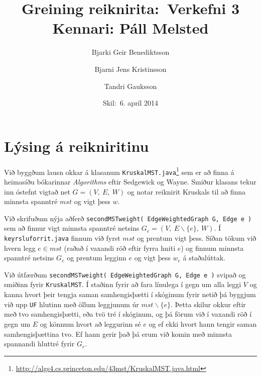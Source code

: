 \documentclass[a4paper,oneside]{article}
\title{
    Greining reiknirita:\ Verkefni 3
    \\\small{Kennari: Páll Melsted}
}
\author{Bjarki Geir Benediktsson \and  Bjarni Jens Kristinsson \and Tandri Gauksson}
\date{\small{Skil:\ 6. apríl 2014}}
\begin{document}
\maketitle

\section{Lýsing á reikniritinu}
Við byggðum lausn okkar á klasanum \texttt{KruskalMST.java}\footnote{\url{http://algs4.cs.princeton.edu/43mst/KruskalMST.java.html}} sem er að finna á heimasíðu bókarinnar \emph{Algorithms} eftir Sedgewick og Wayne. Smiður klasans tekur inn óstefnt vigtað net $G=(V, \ E, \ W)$ og notar reiknirit Kruskals til að finna minnsta spanntré $mst$ og vigt þess $w$.

Við skrifuðum nýja aðferð \texttt{secondMSTweight( EdgeWeightedGraph G, Edge e )} sem að finnur vigt minnsta spanntré netsins $G_e=(V, \ E \smallsetminus \{ e \}, \ W)$. Í \texttt{keyrsluforrit.java} finnum við fyrst $mst$ og prentum vigt þess. Síðan tökum við hvern legg $e \in mst$ (raðað í vaxandi röð eftir fyrra hniti $e$) og finnum minnsta spanntré netsins $G_e$ og prentum legginn $e$ og vigt þess $w_e$ á staðalúttak. 

Við útfærðum \texttt{secondMSTweight( EdgeWeightedGraph G, Edge e )} svipað og smiðinn fyrir \texttt{KruskalMST}. Í staðinn fyrir að fara línulega í gegn um alla leggi $V$ og kanna hvort þeir tengja saman samhengisþætti í skóginum fyrir netið þá byggjum við upp \texttt{UF} hlutinn með öllum leggjunum úr $mst \smallsetminus \{ e \}$. Þetta skilur okkur eftir með tvo samhengisþætti, eða tvö tré í skóginum, og þá förum við í vaxandi röð í gegn um $E$ og könnum hvort að leggurinn sé $e$ og ef ekki hvort hann tengir saman samhengisþættina tvo. Ef hann gerir það þá erum við komin með minnsta spannandi hluttré fyrir $G_e$. \\
\end{document}
